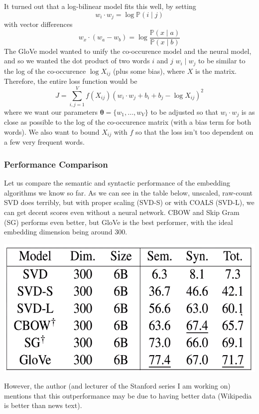 \documentclass{article}
\begin{document}
    It turned out that a log-bilinear model fits this well, by setting 
    \[w_i \cdot w_j = \log \mathbb{P}(i \mid j)\]
    with vector differences 
    \[w_x \cdot (w_a - w_b) = \log \frac{\mathbb{P}(x \mid a)}{\mathbb{P}(x \mid b)}\]
    The GloVe model wanted to unify the co-occurence model and the neural model, and so we wanted the dot product of two words $i$ and $j$ $w_i \mid w_j$ to be similar to the log of the co-occurence $\log{X_{ij}}$ (plus some bias), where $X$ is the matrix. Therefore, the entire loss function would be 
    \[J = \sum_{i, j = 1}^V f(X_{ij}) (w_i \cdot w_j + b_i + b_j - \log{X_{ij}})^2\]
    where we want our parameters $\boldsymbol{\theta} = \{ w_1, \ldots, w_V\}$ to be adjusted so that $w_i \cdot w_j$ is as close as possible to the log of the co-occurence matrix (with a bias term for both words). We also want to bound $X_{ij}$ with $f$ so that the loss isn't too dependent on a few very frequent words. 

    \subsubsection{Performance Comparison}

      Let us compare the semantic and syntactic performance of the embedding algorithms we know so far. As we can see in the table below, unscaled, raw-count SVD does terribly, but with proper scaling (SVD-S) or with COALS (SVD-L), we can get decent scores even without a neural network. CBOW and Skip Gram (SG) performs even better, but GloVe is the best performer, with the ideal embedding dimension being around 300. 
      \begin{center}
          \includegraphics[scale=0.25]{img/comparison.png}
      \end{center}
      However, the author (and lecturer of the Stanford series I am working on) mentions that this outperformance may be due to having better data (Wikipedia is better than news text). 
\end{document}
